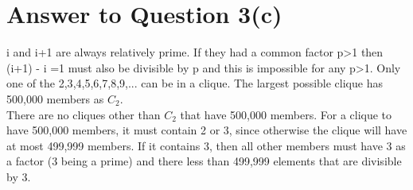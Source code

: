 \documentclass[11pt]{article}
\begin{document}
\section*{Answer to Question 3(c)}
i and i+1 are always relatively prime. If they had a common factor p>1 then (i+1) - i =1 must also be divisible by p and this is impossible for any p>1.
Only one of the {2,3},{4,5},{6,7},{8,9},... can be in a clique. The largest possible clique has 500,000 members as $C_2$.\\
There are no cliques other than $C_2$ that have 500,000 members. For a clique to have 500,000 members, it must contain 2 or 3, since otherwise the clique will have at most 499,999 members. If it contains 3, then all other members must have 3 as a factor (3 being a prime) and there less than 499,999 elements that are divisible by 3.
\end{document}
